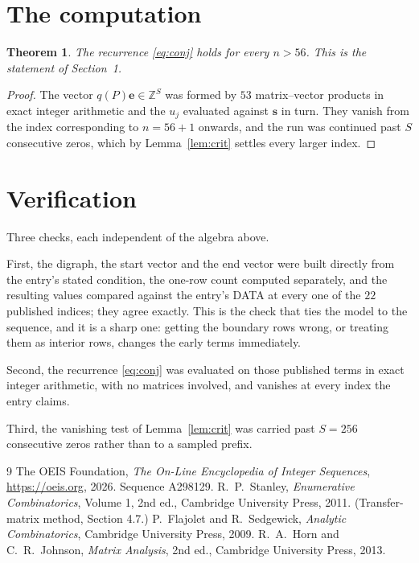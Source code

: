 \documentclass[11pt,a4paper]{article}
\theoremstyle{plain}
\newtheorem{theorem}{Theorem}
\theoremstyle{definition}
\begin{document}
\section{The computation}

\begin{theorem}
The recurrence \eqref{eq:conj} holds for every $n>56$. This is the statement of
Section~1.
\end{theorem}

\begin{proof}
The vector $q(P)\mathbf{e}\in\mathbb{Z}^{S}$ was formed by $53$ matrix--vector
products in exact integer arithmetic and the $u_j$ evaluated against $\mathbf{s}$ in turn.
They vanish from the index corresponding to $n=56+1$ onwards, and the run was continued
past $S$ consecutive zeros, which by Lemma~\ref{lem:crit} settles every larger index.
\end{proof}

\section{Verification}

Three checks, each independent of the algebra above.

First, the digraph, the start vector and the end vector were built directly from the
entry's stated condition, the one-row count computed separately, and the resulting values
compared against the entry's DATA at every one of the $22$ published indices; they
agree exactly. This is the check that ties the model to the sequence, and it is a sharp one:
getting the boundary rows wrong, or treating them as interior rows, changes the early terms
immediately.

Second, the recurrence \eqref{eq:conj} was evaluated on those published terms in exact
integer arithmetic, with no matrices involved, and vanishes at every index the entry claims.

Third, the vanishing test of Lemma~\ref{lem:crit} was carried past $S=256$ consecutive
zeros rather than to a sampled prefix.

\begin{thebibliography}{9}
 The OEIS Foundation, \emph{The On-Line Encyclopedia of Integer
Sequences}, \url{https://oeis.org}, 2026. Sequence A298129.
 R.~P.~Stanley, \emph{Enumerative Combinatorics}, Volume 1, 2nd ed.,
Cambridge University Press, 2011. (Transfer-matrix method, Section 4.7.)
 P.~Flajolet and R.~Sedgewick, \emph{Analytic Combinatorics}, Cambridge
University Press, 2009.
 R.~A.~Horn and C.~R.~Johnson, \emph{Matrix Analysis}, 2nd ed., Cambridge
University Press, 2013.
\end{thebibliography}
\end{document}
